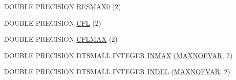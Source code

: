 \begin{DoxyCompactItemize}
D\-O\-U\-B\-L\-E P\-R\-E\-C\-I\-S\-I\-O\-N \hyperlink{msa20_2home_2abonfi_2_c_f_d__codes_2_eul_f_s_83_82_83_2include_2conv_8com_a8567ba07a46a456519bee5aa5a38b1da}{R\-E\-S\-M\-A\-X0} (2)
\item 
D\-O\-U\-B\-L\-E P\-R\-E\-C\-I\-S\-I\-O\-N \hyperlink{msa20_2home_2abonfi_2_c_f_d__codes_2_eul_f_s_83_82_83_2include_2conv_8com_a13e33219ad81cfe3676bf98de68625b4}{C\-F\-L} (2)
\item 
D\-O\-U\-B\-L\-E P\-R\-E\-C\-I\-S\-I\-O\-N \hyperlink{msa20_2home_2abonfi_2_c_f_d__codes_2_eul_f_s_83_82_83_2include_2conv_8com_ac6938ff34c279daaa8c7af56cd95f9cf}{C\-F\-L\-M\-A\-X} (2)
\item 
D\-O\-U\-B\-L\-E P\-R\-E\-C\-I\-S\-I\-O\-N D\-T\-S\-M\-A\-L\-L I\-N\-T\-E\-G\-E\-R \hyperlink{msa20_2home_2abonfi_2_c_f_d__codes_2_eul_f_s_83_82_83_2include_2conv_8com_a281aba02624028804313692bfd933597}{I\-N\-M\-A\-X} (\hyperlink{msa20_2home_2abonfi_2_c_f_d__codes_2_eul_f_s_83_82_83_2include_2paramt_8h_ae08fa28f58a75033834af08d1f9359ce}{M\-A\-X\-N\-O\-F\-V\-A\-R}, 2)
\item 
D\-O\-U\-B\-L\-E P\-R\-E\-C\-I\-S\-I\-O\-N D\-T\-S\-M\-A\-L\-L I\-N\-T\-E\-G\-E\-R \hyperlink{msa20_2home_2abonfi_2_c_f_d__codes_2_eul_f_s_83_82_83_2include_2conv_8com_a268cd66fa54c868e3470a5082cbb9f4f}{I\-N\-D\-E\-L} (\hyperlink{msa20_2home_2abonfi_2_c_f_d__codes_2_eul_f_s_83_82_83_2include_2paramt_8h_ae08fa28f58a75033834af08d1f9359ce}{M\-A\-X\-N\-O\-F\-V\-A\-R}, 2)
\end{DoxyCompactItemize}
